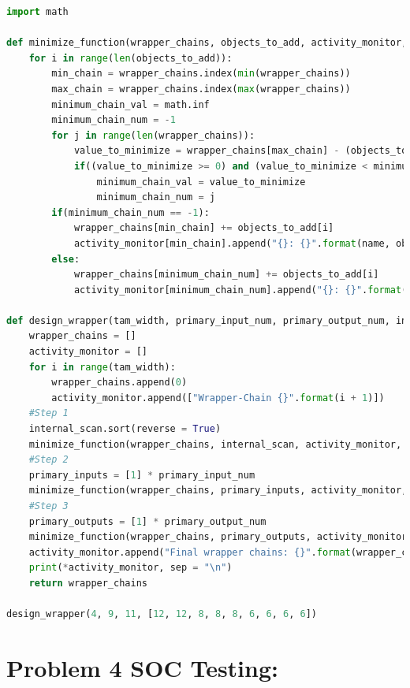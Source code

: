 \documentclass[letterpaper]{article} %
\begin{document}
\begin{lstlisting}[language=Python, caption=Python code used to generate wrapper design.]
import math

def minimize_function(wrapper_chains, objects_to_add, activity_monitor, name):
    for i in range(len(objects_to_add)):
        min_chain = wrapper_chains.index(min(wrapper_chains))
        max_chain = wrapper_chains.index(max(wrapper_chains))
        minimum_chain_val = math.inf
        minimum_chain_num = -1
        for j in range(len(wrapper_chains)):
            value_to_minimize = wrapper_chains[max_chain] - (objects_to_add[i] + wrapper_chains[j])
            if((value_to_minimize >= 0) and (value_to_minimize < minimum_chain_val)):
                minimum_chain_val = value_to_minimize
                minimum_chain_num = j
        if(minimum_chain_num == -1):
            wrapper_chains[min_chain] += objects_to_add[i]
            activity_monitor[min_chain].append("{}: {}".format(name, objects_to_add[i]))
        else:
            wrapper_chains[minimum_chain_num] += objects_to_add[i]
            activity_monitor[minimum_chain_num].append("{}: {}".format(name, objects_to_add[i]))

def design_wrapper(tam_width, primary_input_num, primary_output_num, internal_scan):
    wrapper_chains = []
    activity_monitor = []
    for i in range(tam_width):
        wrapper_chains.append(0)
        activity_monitor.append(["Wrapper-Chain {}".format(i + 1)])
    #Step 1
    internal_scan.sort(reverse = True)
    minimize_function(wrapper_chains, internal_scan, activity_monitor, "sc")
    #Step 2
    primary_inputs = [1] * primary_input_num
    minimize_function(wrapper_chains, primary_inputs, activity_monitor, "pi")
    #Step 3
    primary_outputs = [1] * primary_output_num
    minimize_function(wrapper_chains, primary_outputs, activity_monitor, "po")
    activity_monitor.append("Final wrapper chains: {}".format(wrapper_chains))
    print(*activity_monitor, sep = "\n")
    return wrapper_chains

design_wrapper(4, 9, 11, [12, 12, 8, 8, 8, 6, 6, 6, 6])
\end{lstlisting}

\newpage

\section*{Problem 4 \small{SOC Testing:}}
\end{document}
